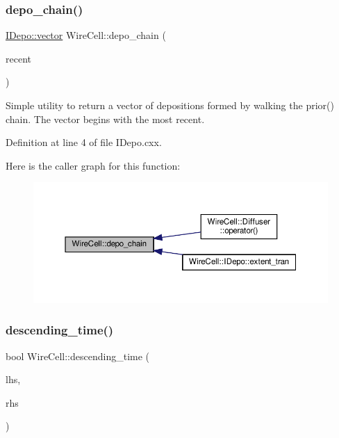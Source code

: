 \subsubsection{\texorpdfstring{depo\+\_\+chain()}{depo\_chain()}}
{\footnotesize\ttfamily \hyperlink{class_wire_cell_1_1_i_data_ae1a9f863380499bb43f39fabb6276660}{I\+Depo\+::vector} Wire\+Cell\+::depo\+\_\+chain (\begin{DoxyParamCaption}\item[{\hyperlink{class_wire_cell_1_1_i_data_aff870b3ae8333cf9265941eef62498bc}{I\+Depo\+::pointer}}]{recent }\end{DoxyParamCaption})}

Simple utility to return a vector of depositions formed by walking the prior() chain. The vector begins with the most recent. 

Definition at line 4 of file I\+Depo.\+cxx.

Here is the caller graph for this function\+:
\nopagebreak
\begin{figure}[H]
\begin{center}
\leavevmode
\includegraphics[width=350pt]{namespace_wire_cell_a78bd389d29c322c5a6822bee8581ee73_icgraph}
\end{center}
\end{figure}
\mbox{\label{namespace_wire_cell_a8cd3697f742b73810ac49feb370e4a04}} 
\subsubsection{\texorpdfstring{descending\+\_\+time()}{descending\_time()}}
{\footnotesize\ttfamily bool Wire\+Cell\+::descending\+\_\+time (\begin{DoxyParamCaption}\item[{const \hyperlink{class_wire_cell_1_1_i_data_aff870b3ae8333cf9265941eef62498bc}{Wire\+Cell\+::\+I\+Depo\+::pointer} \&}]{lhs,  }\item[{const \hyperlink{class_wire_cell_1_1_i_data_aff870b3ae8333cf9265941eef62498bc}{Wire\+Cell\+::\+I\+Depo\+::pointer} \&}]{rhs }\end{DoxyParamCaption})}



